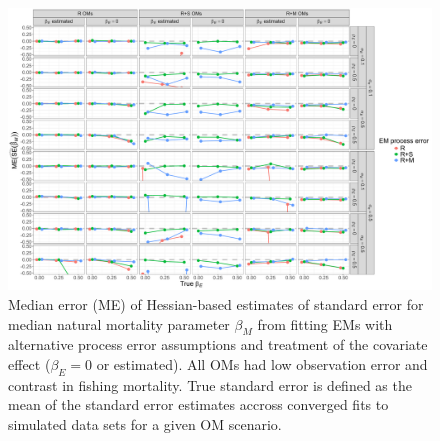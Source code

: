 \documentclass[
  12pt,
]{article}
\begin{document}
\begin{landscape}
\begin{figure}
\begin{center}
\includegraphics[height = \textheight]{se_beta_M_bias_main}
\end{center}
\caption{Median error (ME) of Hessian-based estimates of standard error for median natural mortality parameter $\beta_M$ from fitting EMs with alternative process error assumptions and treatment of the covariate effect ($\beta_ E= 0$ or estimated). All OMs had low observation error and contrast in fishing mortality. True standard error is defined as the mean of the standard error estimates accross converged fits to simulated data sets for a given OM scenario.}\label{se_beta_M_bias}
\end{figure}
\end{landscape}
\end{document}
